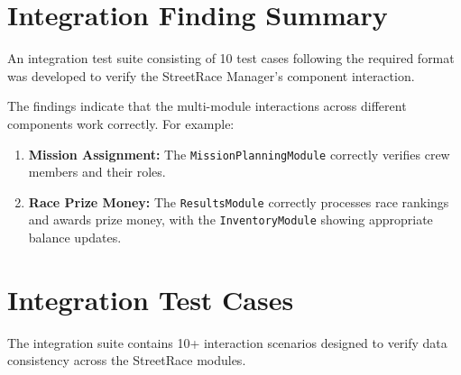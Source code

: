\documentclass{article}
\begin{document}
\section{Integration Finding Summary}
An integration test suite consisting of 10 test cases following the required format was developed to verify the StreetRace Manager's component interaction.

The findings indicate that the multi-module interactions across different components work correctly. For example:
\begin{enumerate}
    \item \textbf{Mission Assignment:} The \texttt{MissionPlanningModule} correctly verifies crew members and their roles.
    \item \textbf{Race Prize Money:} The \texttt{ResultsModule} correctly processes race rankings and awards prize money, with the \texttt{InventoryModule} showing appropriate balance updates.
\end{enumerate}

\section{Integration Test Cases}
The integration suite contains 10+ interaction scenarios designed to verify data consistency across the StreetRace modules.
\end{document}
